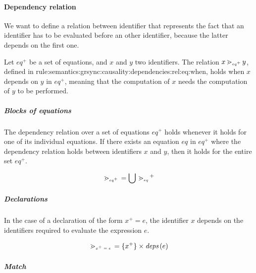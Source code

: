 \paragraph{Dependency relation}
\label{sec:semantics:grsync:causality:dependencies:rel}

\newcommand{\depRel}[3]{{\ensuremath{#2 \, {\gtrdot}_{\mathtiny{#1}} \, #3}}}
\newcommand{\depOrd}[3]{{\ensuremath{#2 \, {>}_{\mathtiny{#1}} \, #3}}}

We want to define a relation between identifier that represents the fact that an identifier has to
be evaluated before an other identifier, because the latter depends on the first one.

\begin{definition}
    Let $eq^+$ be a set of \GRSync equations, and $x$ and $y$ two identifiers.
    The relation $\depRel{eq^+}{x}{y}$, defined in
    {rule:semantics:grsync:causality:dependencies:rel:eq:when}, holds when $x$ depends on $y$ in $eq^+$,
    meaning that the computation of $x$ needs the computation of $y$ to be performed.
\end{definition}

\subparagraph{Blocks of equations}

The dependency relation over a set of equations $eq^+$ holds whenever it holds for one of its
individual equations. If there exists an equation $eq$ in $eq^+$ where the dependency relation holds
between identifiers $x$ and $y$, then it holds for the entire set $eq^+$.

\begin{equation}
    \depRel{eq^+}{}{} = \bigcup \depRel{eq}{}{}^+ \label{rule:semantics:grsync:causality:dependencies:rel:eq}
\end{equation}

\subparagraph{Declarations}

In the case of a declaration of the form $x^+ = e$, the identifier $x$ depends on the identifiers
required to evaluate the expression $e$.

\begin{equation}
    \depRel{x^+ = e}{}{} = \{x^+\} \times \deps{e} \label{rule:semantics:grsync:causality:dependencies:rel:eq:decl}
\end{equation}

\subparagraph{Match}

